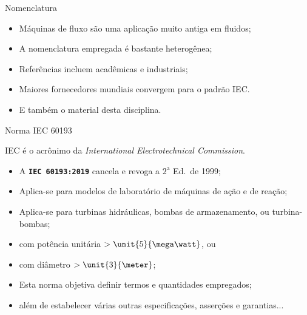     \begin{frame}{Nomenclatura}\vspace*{-1em}

        \begin{itemize}
            \item<1-> Máquinas de fluxo são uma \alert{aplicação muito antiga} em fluidos;
            \item<1-> A \alert{nomenclatura} empregada é \alert{bastante heterogênea};
            \item<2-> Referências incluem \alert{acadêmicas} e \alert{industriais};
            \item<2-> \alert{Maiores fornecedores mundiais} convergem para o \alert{padrão IEC}.
            \item<3-> E também o material desta disciplina.
        \end{itemize}

    \end{frame}

    \begin{frame}{Norma IEC 60193}\vspace*{-1em}

        IEC é o acrônimo da \textit{International Electrotechnical Commission\/}.
        \vspace*{\medskipamount}

        \begin{itemize}
            \item<1-> A \alert{\textbf{\texttt{IEC 60193:2019}}} cancela e revoga a
                $2^{\mathrm{a}}$ Ed.~de 1999;
            \item<1-> Aplica-se para \alert{modelos de laboratório} de máquinas de \alert{ação}
                e de \alert{reação};
            \item<1-> Aplica-se para \alert{turbinas hidráulicas}, \alert{bombas de
                armazenamento}, ou \alert{turbina-bombas};
            \item<2-> com \alert{potência unitária $> \unit{5}{\mega\watt}$}, ou
            \item<2-> com \alert{diâmetro $> \unit{3}{\meter}$};
            \item<3-> Esta norma objetiva \alert{definir termos e quantidades} empregados;
            \item<3-> além de estabelecer várias outras \alert{especificações},
                \alert{asserções} e \alert{garantias}...
        \end{itemize}

    \end{frame}

